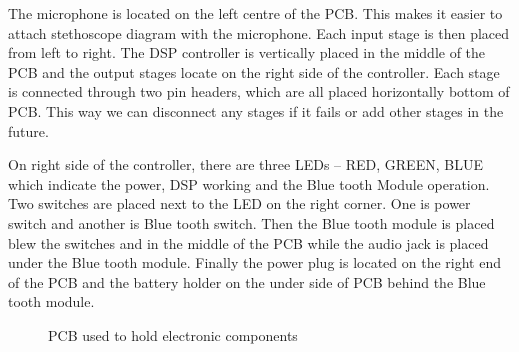 The microphone is located on the left centre of the PCB. This makes it easier to attach stethoscope diagram with the microphone. Each input stage is then placed from left to right. The DSP controller is vertically placed in the middle of the PCB and the output stages locate on the right side of the controller. Each stage is connected through two pin headers, which are all placed horizontally bottom of PCB. This way we can disconnect any stages if it fails or add other stages in the future.

On right side of the controller, there are three LEDs – RED, GREEN, BLUE which indicate the power, DSP working and the Blue tooth Module operation. Two switches are placed next to the LED on the right corner. One is power switch and another is Blue tooth switch. Then the Blue tooth module is placed blew the switches and in the middle of the PCB while the audio jack is placed under the Blue tooth module. Finally the power plug is located on the right end of the PCB and the battery holder on the under side of PCB behind the Blue tooth module.
\begin{figure}[!htb]
	\centering
	\caption{PCB used to hold electronic components}
	\label{fig:pcb}
\end{figure}